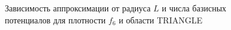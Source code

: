 \documentclass[a4paper, 12pt]{article}
\begin{document}
                \begin{figure}[h!]
                  \noindent{}
                  \caption{Зависимость аппроксимации от радиуса $L$ и числа базисных потенциалов для плотности $f_6$ и области TRIANGLE}
                  \label{nolnol}
                  \end{figure} 
\end{document}
